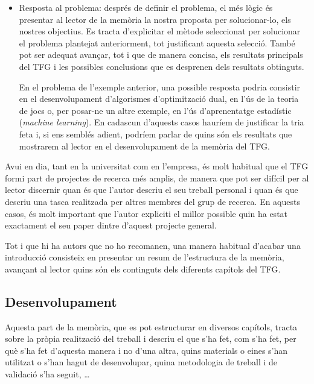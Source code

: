 \begin{itemize}
   \item Resposta al problema: després de definir el problema, el més lògic és presentar al lector de la memòria la nostra proposta per solucionar-lo, els nostres objectius. Es tracta d'explicitar el mètode seleccionat per solucionar el problema plantejat anteriorment, tot justificant aquesta selecció. També pot ser adequat avançar, tot i que de manera concisa, els resultats principals del \ac{TFG} i les possibles conclusions que es desprenen dels resultats obtinguts.

       En el problema de l'exemple anterior, una possible resposta podria consistir en el desenvolupament d'algorismes d'optimització dual, en l'ús de la teoria de jocs o, per posar-ne un altre exemple, en l'ús d'aprenentatge estadístic (\emph{machine learning}). En cadascun d'aquests casos hauríem de justificar la tria feta i, si ens semblés adient, podríem parlar de quins són els resultats que mostrarem al lector en el desenvolupament de la memòria del \ac{TFG}.

\end{itemize}


Avui en dia, tant en la universitat com en l'empresa, és molt habitual que el \ac{TFG} formi part de projectes de recerca més amplis, de manera que pot ser difícil per al lector discernir quan és que l'autor descriu el seu treball personal i quan és que descriu una tasca realitzada per altres membres del grup de recerca. En aquests casos, és molt important que l'autor expliciti el millor possible quin ha estat exactament el seu paper dintre d'aquest projecte general.

Tot i que hi ha autors que no ho recomanen, una manera habitual d'acabar una introducció consisteix en presentar un resum de l'estructura de la memòria, avançant al lector quins són els continguts dels diferents capítols del \ac{TFG}.


\subsection{Desenvolupament}

Aquesta part de la memòria, que es pot estructurar en diversos capítols, tracta sobre la pròpia realització del treball i descriu el que s'ha fet, com s'ha fet, per què s'ha fet d'aquesta manera i no d'una altra, quins materials o eines s'han utilitzat o s'han hagut de desenvolupar, quina metodologia de treball i de validació s'ha seguit, \ldots

